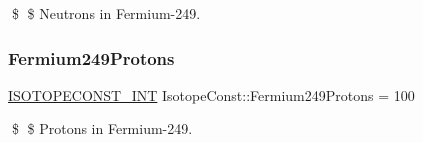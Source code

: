 \$ \$ Neutrons in Fermium-\/249. \mbox{\label{group___isotope_const-_fermium-_fm249_ga0fb2d54acfd570576f9e73f773a72ea2}} 
\subsubsection{\texorpdfstring{Fermium249\+Protons}{Fermium249Protons}}
{\footnotesize\ttfamily \mbox{\hyperlink{group___isotope_const-_macros_ga5f18360b3e99483a35c32d789e62621c}{I\+S\+O\+T\+O\+P\+E\+C\+O\+N\+S\+T\+\_\+\+I\+NT}} Isotope\+Const\+::\+Fermium249\+Protons = 100}

\$ \$ Protons in Fermium-\/249. 